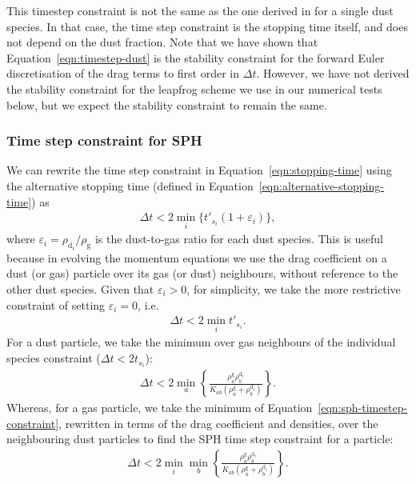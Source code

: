 \documentclass[fleqn,usenatbib]{mnras}
\newcommand{\g}{\mathrm{g}}
\newcommand{\dd}{\mathrm{d}}
\begin{document}
This timestep constraint is not the same as the one derived in
\citet{Laibe2012MNRAS.420.2345L} for a single dust species. In that case, the
time step constraint is the stopping time itself, and does not depend on the
dust fraction. Note that we have shown that Equation~\ref{eqn:timestep-dust} is
the stability constraint for the forward Euler discretisation of the drag terms
to first order in \(\Delta t\). However, we have not derived the stability
constraint for the leapfrog scheme we use in our numerical tests below, but we
expect the stability constraint to remain the same.

\subsubsection{Time step constraint for SPH}

We can rewrite the time step constraint in Equation~\ref{eqn:stopping-time}
using the alternative stopping time
(defined in Equation~\ref{eqn:alternative-stopping-time}) as
%
\begin{align}
   \Delta t < 2 \min_i \{t'_{s_i} (1 + \varepsilon_i)\},
\end{align}
%
where \(\varepsilon_i = \rho_{\dd_i} / \rho_{\g}\) is the dust-to-gas ratio for
each dust species. This is useful because in evolving the momentum equations we
use the drag coefficient on a dust (or gas) particle over its gas (or dust)
neighbours, without reference to the other dust species. Given that
\(\varepsilon_i > 0\), for simplicity, we take the more restrictive constraint
of setting \(\varepsilon_i = 0\), i.e.
%
\begin{align}
   \label{eqn:sph-timestep-constraint}
   \Delta t < 2 \min_i t'_{s_i}.
\end{align}
%
For a dust particle, we take the minimum over gas neighbours of the individual
species constraint (\(\Delta t < 2 t_{s_i}\)):
%
\begin{align}
   \Delta t < 2 \min_{a}
   \left\{ \frac{\rho^{\g}_a \rho^{\dd_i}_b}{K_{ab} (\rho^{\g}_a + \rho^{\dd_i}_b)} \right\}.
\end{align}
%
Whereas, for a gas particle, we take the minimum of
Equation~\ref{eqn:sph-timestep-constraint}, rewritten in terms of the drag
coefficient and densities, over the neighbouring dust particles to find the SPH
time step constraint for a particle:
%
\begin{align}
   \Delta t < 2 \min_i \min_{b}
   \left\{ \frac{\rho^{\g}_a \rho^{\dd_i}_b}{K_{ab} (\rho^{\g}_a + \rho^{\dd_i}_b)} \right\}.
\end{align}
%
\end{document}
